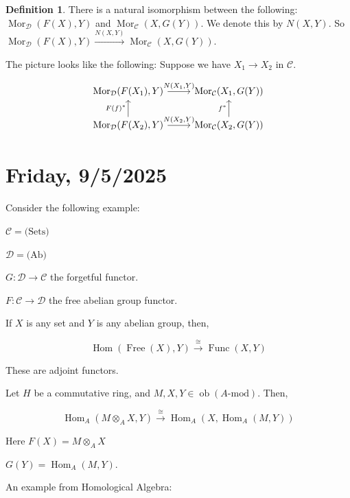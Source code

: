 \documentclass{article}
\theoremstyle{definition}
\newtheorem*{definition}{Definition}
\begin{document}
    \begin{definition}
        There is a natural isomorphism between the following: \(\operatorname{Mor}_{\mathcal{D}}(F(X), Y)\) and \(\operatorname{Mor}_{\mathcal{C}}(X, G(Y))\). We denote this by \(N(X,Y)\). So \(\operatorname{Mor}_{\mathcal{D}}(F(X),Y) \xrightarrow{N(X,Y)} \operatorname{Mor}_{\mathcal{C}} (X,G(Y))\).
    \end{definition}

    The picture looks like the following: 
    Suppose we have \(X_1 \to X_2\) in \(\mathcal{C}\). 

    \[
        \begin{tikzcd}
            \operatorname{Mor}_{\mathcal{D}}(F(X_1),Y) \ar[r,"{N(X_1,Y)}"] & \operatorname{Mor}_{\mathcal{C}} (X_1, G(Y)) \\ \operatorname{Mor}_{\mathcal{D}}(F(X_2),Y) \ar[r,"{N(X_2,Y)}"] \ar[u,"F(f)^{\ast}"] & \operatorname{Mor}_{\mathcal{C}} (X_2, G(Y)) \ar[u,"f^{\ast}"] 
        \end{tikzcd}
    \]

    \section*{Friday, 9/5/2025}
    
    Consider the following example:

    \(\mathcal{C} = \text{(Sets)}\)
    
    \(\mathcal{D} = \text{(Ab)}\)

    \(G: \mathcal{D} \to \mathcal{C}\) the forgetful functor.

    \(F: \mathcal{C} \to \mathcal{D}\) the free abelian group functor.

    If \(X\) is any set and \(Y\) is any abelian group, then,

    \[
        \operatorname{Hom}(\operatorname{Free}(X), Y) \xrightarrow{\cong} \operatorname{Func} (X,Y)
    \]

    These are adjoint functors.

    Let \(H\) be a commutative ring, and \(M,X,Y\in \operatorname{ob}(A \text{-mod})\). Then,

    \[
        \operatorname{Hom}_A(M \otimes_A X, Y) \xrightarrow{\cong} \operatorname{Hom}_A (X, \operatorname{Hom}_A(M,Y))
    \]

    Here \(F(X)= M \otimes_A X\)
    
    \(G(Y) = \operatorname{Hom}_A (M,Y)\).

    An example from Homological Algebra:
\end{document}
